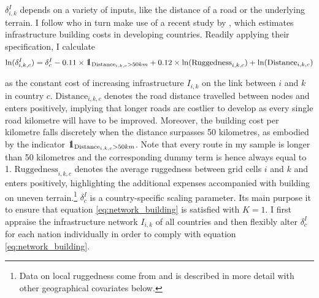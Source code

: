 \documentclass[11pt, oneside]{article}   	%
\def\one{\mbox{1\hspace{-4.25pt}\fontsize{12}{14.4}\selectfont\textrm{1}}} %
\begin{document}
$\delta_{i,k}^{I}$ depends on a variety of inputs, like the distance of a road or the underlying terrain. I follow \citeauthor{fajgelbaum_optimal_2017} who in turn make use of a recent study by \cite{collier_cost_2015}, which estimates infrastructure building costs in developing countries. Readily applying their specification, I calculate
\begin{equation}
  \textrm{ln}(\delta^{I}_{i,k,c}) = \delta_{c}^{I} - 0.11 \times \one_{\textrm{Distance}_{i,k,c} > 50km} + 0.12 \times \textrm{ln}(\textrm{Ruggedness}_{i,k,c}) + \textrm{ln}(\textrm{Distance}_{i,k,c})
  \label{eq:delta_I}
\end{equation}

as the constant cost of increasing infrastructure $I_{i,k}$ on the link between $i$ and $k$ in country $c$. $\textrm{Distance}_{i,k,c}$ denotes the road distance travelled between nodes and enters positively, implying that longer roads are costlier to develop as every single road kilometre will have to be improved. Moreover, the building cost per kilometre falls discretely when the distance surpasses 50 kilometres, as embodied by the indicator $\one_{\textrm{Distance}_{i,k,c} > 50km}$. Note that every route in my sample is longer than 50 kilometres and the corresponding dummy term is hence always equal to 1. $\textrm{Ruggedness}_{i,k,c}$ denotes the average ruggedness between grid cells $i$ and $k$ and enters positively, highlighting the additional expenses accompanied with building on uneven terrain.\footnote{Data on local ruggedness come from \cite{henderson_global_2018} and is described in more detail with other geographical covariates below.} $\delta_{c}^{I}$ is a country-specific scaling parameter. Its main purpose it to ensure that equation \eqref{eq:network_building} is satisfied with $K=1$. I first appraise the infrastructure network $I_{i,k}$ of all countries and then flexibly alter $\delta_{c}^{I}$ for each nation individually in order to comply with equation \eqref{eq:network_building}.
\end{document}
